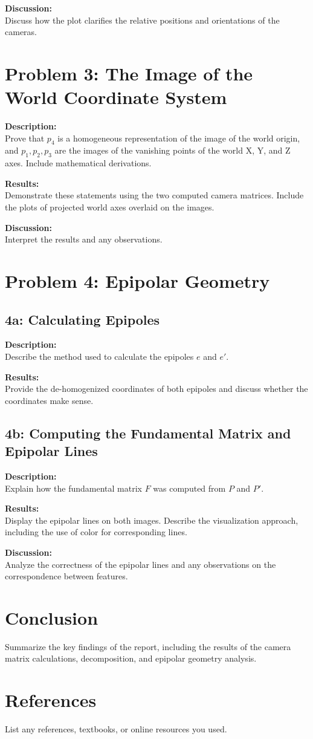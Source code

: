 \documentclass{article}
\begin{document}
\textbf{Discussion:} \\
Discuss how the plot clarifies the relative positions and orientations of the cameras.

\section{Problem 3: The Image of the World Coordinate System}
\textbf{Description:} \\
Prove that \(p_4\) is a homogeneous representation of the image of the world origin, and \(p_1, p_2, p_3\) are the images of the vanishing points of the world X, Y, and Z axes. Include mathematical derivations.

\textbf{Results:} \\
Demonstrate these statements using the two computed camera matrices. Include the plots of projected world axes overlaid on the images.

\textbf{Discussion:} \\
Interpret the results and any observations.

\section{Problem 4: Epipolar Geometry}

\subsection{4a: Calculating Epipoles}
\textbf{Description:} \\
Describe the method used to calculate the epipoles \(e\) and \(e'\).

\textbf{Results:} \\
Provide the de-homogenized coordinates of both epipoles and discuss whether the coordinates make sense.

\subsection{4b: Computing the Fundamental Matrix and Epipolar Lines}
\textbf{Description:} \\
Explain how the fundamental matrix \(F\) was computed from \(P\) and \(P'\).

\textbf{Results:} \\
Display the epipolar lines on both images. Describe the visualization approach, including the use of color for corresponding lines.

\textbf{Discussion:} \\
Analyze the correctness of the epipolar lines and any observations on the correspondence between features.

\section{Conclusion}
Summarize the key findings of the report, including the results of the camera matrix calculations, decomposition, and epipolar geometry analysis.

\section{References}
List any references, textbooks, or online resources you used.
\end{document}

